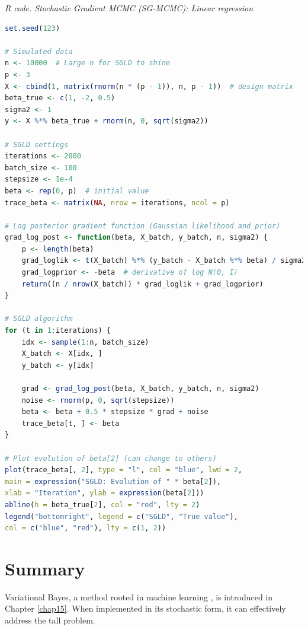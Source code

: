 \begin{tcolorbox}[enhanced,width=4.67in,center upper,
	fontupper=\large\bfseries,drop shadow southwest,sharp corners]
	\textit{R code. Stochastic Gradient MCMC (SG-MCMC): Linear regression}
	\begin{VF}
		\begin{lstlisting}[language=R]
set.seed(123)

# Simulated data
n <- 10000  # Large n for SGLD to shine
p <- 3
X <- cbind(1, matrix(rnorm(n * (p - 1)), n, p - 1))  # design matrix
beta_true <- c(1, -2, 0.5)
sigma2 <- 1
y <- X %*% beta_true + rnorm(n, 0, sqrt(sigma2))

# SGLD settings
iterations <- 2000
batch_size <- 100
stepsize <- 1e-4
beta <- rep(0, p)  # initial value
trace_beta <- matrix(NA, nrow = iterations, ncol = p)

# Log posterior gradient function (Gaussian likelihood and prior)
grad_log_post <- function(beta, X_batch, y_batch, n, sigma2) {
	p <- length(beta)
	grad_loglik <- t(X_batch) %*% (y_batch - X_batch %*% beta) / sigma2
	grad_logprior <- -beta  # derivative of log N(0, I)
	return((n / nrow(X_batch)) * grad_loglik + grad_logprior)
}

# SGLD algorithm
for (t in 1:iterations) {
	idx <- sample(1:n, batch_size)
	X_batch <- X[idx, ]
	y_batch <- y[idx]
	
	grad <- grad_log_post(beta, X_batch, y_batch, n, sigma2)
	noise <- rnorm(p, 0, sqrt(stepsize))
	beta <- beta + 0.5 * stepsize * grad + noise
	trace_beta[t, ] <- beta
}

# Plot evolution of beta[2] (can change to others)
plot(trace_beta[, 2], type = "l", col = "blue", lwd = 2,
main = expression("SGLD: Evolution of " * beta[2]),
xlab = "Iteration", ylab = expression(beta[2]))
abline(h = beta_true[2], col = "red", lty = 2)
legend("bottomright", legend = c("SGLD", "True value"),
col = c("blue", "red"), lty = c(1, 2))
		\end{lstlisting}
	\end{VF}
\end{tcolorbox}

\section{Summary}\label{13_6}
Variational Bayes, a method rooted in machine learning \cite{wainwright2008graphical}, is introduced in Chapter \ref{chap15}. When implemented in its stochastic form, it can effectively address the tall problem.

